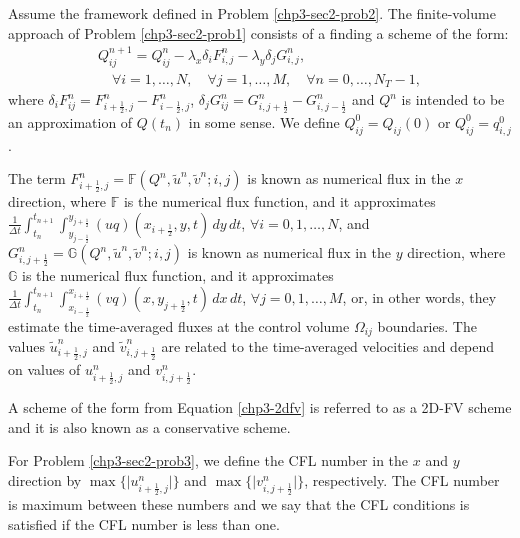 \begin{prob}[2D-FV scheme]
	\label{chp3-sec2-prob3}
	Assume the framework defined in Problem \ref{chp3-sec2-prob2}.
	The finite-volume approach of Problem \ref{chp3-sec2-prob1}
	consists of a finding a scheme of the form:
	\begin{align}
		\label{chp3-2dfv}
		{Q}_{ij}^{n+1} =  {Q}_{ij}^{n} - {\lambda_x} \delta_i {F}_{i,j}^{n} - {\lambda_y } \delta_j {G}_{i,j}^{n},
		\\ \nonumber \quad \forall i = 1, \ldots, N, \quad \forall j = 1, \ldots, M,
		\quad \forall n = 0, \ldots, N_T-1,
	\end{align}
	where $ \delta_i F_{ij}^n =
    {F}_{i+\frac{1}{2},j}^{n} 
    - {F}_{i-\frac{1}{2},j}^{n}$,
    $ \delta_j G_{ij}^n =
    {G}_{i,j+\frac{1}{2}}^{n} 
    - {G}_{i,j-\frac{1}{2}}^{n}$ 
    and ${Q}^{n}$ is intended to be an approximation
	of ${Q}(t_{n})$ in some sense. We define ${Q}_{ij}^{0} = {Q}_{ij}(0)$ or
	${Q}_{ij}^{0} = {q}^0_{i,j}$.
    
    The term ${F}_{i+\frac{1}{2}, j}^{n} = {\mathbb{F}}
    (Q^n, \tilde{u}^n, \tilde{v}^n; i,j)
    $ is known as numerical flux in the 
    $x$ direction, where $\mathbb{F}$ is the numerical flux function, 
    and it approximates
	$\frac{1}{\Delta t}\int_{t_n}^{t_{n+1}} 
    \int_{y_{j-\frac{1}{2}}}^{y_{j+\frac{1}{2}}} 
    (uq)(x_{i+\frac{1}{2}}, y, t) \,dy \,dt $,
    $\forall i = 0, 1, \ldots, N$, and 
	${G}_{i, j+\frac{1}{2}}^{n} = 
    {\mathbb{G}} (Q^n, \tilde{u}^n, \tilde{v}^n; i, j)$ 
    is known as numerical flux in the 
    $y$ direction, where $\mathbb{G}$ 
    is the numerical flux function, and it approximates
	$\frac{1}{\Delta t}\int_{t_n}^{t_{n+1}}  
    \int_{x_{i-\frac{1}{2}}}^{x_{i+\frac{1}{2}}}
    (vq)(x, y_{j+\frac{1}{2}}, t) \,dx \,dt $,
    $\forall j = 0, 1, \ldots, M$,
	or, in other words, they estimate the time-averaged
    fluxes at the control volume $\Omega_{ij}$ boundaries.
  	The values $\tilde{u}_{i+\frac{1}{2},j}^n$ and $\tilde{v}_{i,j+\frac{1}{2}}^n$ are related to the time-averaged velocities
  	and depend on values of $u_{i+\frac{1}{2},j}^n$ and $v_{i,j+\frac{1}{2}}^n$.
\end{prob}
\begin{remark}
	A scheme of the form from Equation \eqref{chp3-2dfv} is referred to as a 2D-FV scheme and
	it is also known as a conservative scheme.
\end{remark}
\begin{remark}
For Problem \ref{chp3-sec2-prob3}, we define the CFL number in the $x$ and $y$ direction
by $\max \{{|u_{i+\frac{1}{2},j}^n}|\}$ and $\max \{ {|v_{i,j+\frac{1}{2}}^n}|\}$, respectively.
The CFL number is maximum between these numbers and we say that the CFL conditions is
satisfied if the CFL number is less than one. 
\end{remark}
